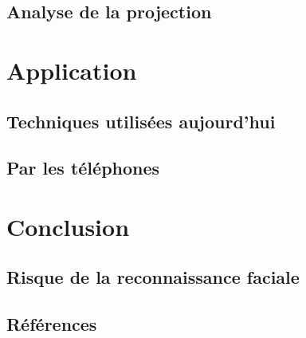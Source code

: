 \documentclass{beamer}
\theoremstyle{plain}
\theoremstyle{definition}
\begin{document}
\subsection{Analyse de la projection}

\section{Application}
\subsection{Techniques utilisées aujourd'hui}
\subsection{Par les téléphones}

\section{Conclusion}
\subsection{Risque de la reconnaissance faciale}
\subsection{Références}
\end{document}
